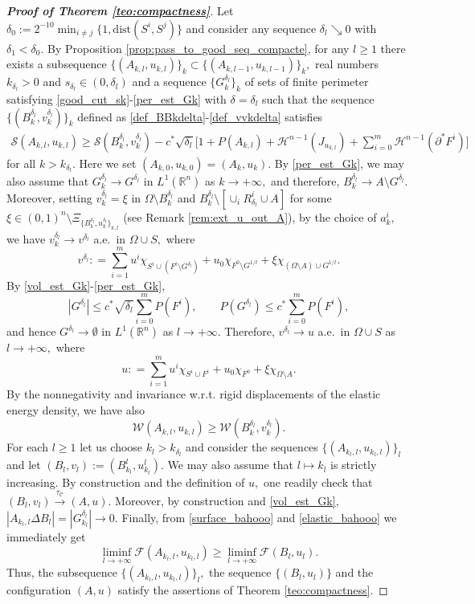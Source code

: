 \documentclass[reqno]{amsart}
\numberwithin{equation}{section}
\theoremstyle{plain}
\theoremstyle{definition}
\newcommand{\R}{\mathbb{R}}
\newcommand{\cH}{\mathcal{H}}
\newcommand{\cS}{\mathcal{S}}
\newcommand{\cF}{\mathcal{F}}
\newcommand{\cW}{\mathcal{W}}
\newcommand{\p}{\partial}
\newcommand{\dist}{\mathrm{dist}}
\newcommand{\admissible}{\mathcal{C}}
\begin{document}
\begin{proof}[\textbf{Proof of Theorem \ref{teo:compactness}}]
Let $\delta_0 := 2^{-10}\min_{i\ne j}\{1,\dist(S^i,S^j)\}$ and consider any sequence $\delta_l\searrow0$ with $\delta_1< \delta_0.$  By Proposition \ref{prop:pass_to_good_seq_compacte}, for any $l\ge1$ there exists a subsequence $\{(A_{k,l},u_{k,l})\}_k \subset \{(A_{k,l-1},u_{k,l-1})\}_k,$ real numbers $k_{\delta_l}>0$  and $s_{\delta_l}\in (0,\delta_l)$ and a sequence $\{G_k^{\delta_l}\}_k$ of sets of finite perimeter satisfying \eqref{good_cut_sk}-\eqref{per_est_Gk} with $\delta = \delta_l$ such that the sequence $\{(B_k^{\delta_l}, v_k^{\delta_l})\}_k$ defined as \eqref{def_BBkdelta}-\eqref{def_vvkdelta} satisfies
\begin{align}
\cS(A_{k,l},u_{k,l}) \ge  \cS(B_k^{\delta_l},v_k^{\delta_l}) 
- c^*
 \sqrt{\delta_l} \Big[1+ P(A_{k,l}) + \cH^{n-1}(J_{u_{k,l}}) +  \sum\limits_{i=0}^m \cH^{n-1}(\p^*F^i)\Big] \label{surface_bahooo}
\end{align}
for all $k>k_{\delta_l}.$ Here we set $(A_{k,0},u_{k,0}) = (A_k,u_k).$ By \eqref{per_est_Gk}, we may also assume that $G_k^{\delta_l} \to G^{\delta_l}$ in $L^1(\R^n)$ as $k\to+\infty,$ and therefore, $B_k^{\delta_l} \to A\setminus G^{\delta_l}.$
Moreover, setting $v_k^{\delta_l} = \xi$ in $\Omega\setminus B_k^{\delta_l}$ and $B_k^{\delta_l}\setminus [\cup_i R_{\delta_l}^i\cup A]$ for some $\xi\in (0,1)^n\setminus \Xi_{\{B_k^{\delta_l},u_k^{\delta_l}\}_{k,l}}$ (see Remark \ref{rem:ext_u_out_A}),  by the choice of $a_k^i,$ we have
$
v_k^{\delta_l} \to v^{\delta_l}
$
a.e.\  in $\Omega\cup S,$ where 
$$
v^{\delta_l}: = \sum\limits_{i=1}^m u^i\chi_{S^i\cup (F^i\setminus G^{\delta_l})} + u_0\chi_{F^0\setminus G^{1/l}} + \xi \chi_{(\Omega\setminus A)\cup G^{1/l}}.
$$
By \eqref{vol_est_Gk}-\eqref{per_est_Gk},
$$
|G^{\delta_l}| \le c^*\sqrt{\delta_l}  \sum_{i=0}^m P(F^i),\qquad 
P(G^{\delta_l}) \le c^*\sum_{i=0}^m P(F^i),
$$
and hence $G^{\delta_l} \to \emptyset$ in $L^1(\R^n)$ as $l\to+\infty.$ Therefore, $v^{\delta_l} \to u$ a.e.\  in $\Omega\cup S$ as $l\to+\infty,$ where
$$
u: = \sum\limits_{i=1}^m u^i\chi_{S^i\cup F^i} + u_0\chi_{F^0} + \xi \chi_{\Omega\setminus A}.
$$
By the nonnegativity and invariance w.r.t. rigid displacements of the elastic energy density, we have also
\begin{equation}
 \cW(A_{k,l},u_{k,l}) \ge \cW(B_k^{\delta_l},v_k^{\delta_l}). 
\label{elastic_bahooo}
\end{equation}
%
For each $l\ge1$ let us choose $k_l > k_{\delta_l}$  and consider the sequences $\{(A_{k_l,l},u_{k_l,l})\}_l$ and let $(B_l,v_l):=(B_{k_l}^l,u_{k_l}^l).$ We may also assume that $l\mapsto k_l$ is strictly increasing. By construction and the definition of $u,$ one readily check that 
$(B_l,v_l) \overset{\tau_\admissible}{\longrightarrow} (A,u).$ Moreover, by construction and \eqref{vol_est_Gk}, $|A_{k_l,l}\Delta B_l| = |G_{k_l}^{\delta_l}|\to 0.$
Finally, from \eqref{surface_bahooo} and \eqref{elastic_bahooo} we immediately get 
$$
\liminf\limits_{l\to+\infty} \cF(A_{k_l,l},u_{k_l,l}) \ge 
\liminf\limits_{l\to+\infty} \cF(B_l,u_l). 
$$
Thus, the subsequence $\{(A_{k_l,l},u_{k_l,l})\}_l,$ the sequence $\{(B_l,u_l)\}$ and the configuration $(A,u)$ satisfy the assertions of Theorem \ref{teo:compactness}.
% 
\end{proof}
\end{document}
